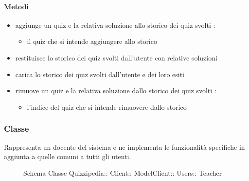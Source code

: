 \paragraph{Metodi}
\begin{itemize}
\item {}
\newline
aggiunge un quiz e la relativa soluzione allo storico dei quiz svolti
\newline
{} :
\begin{itemize}
\item {}
\newline
il quiz che si intende aggiungere allo storico
\end{itemize}
\item {}
\newline
restituisce lo storico dei quiz svolti dall'utente con relative soluzioni
\newline
\item {}
\newline
carica lo storico dei quiz svolti dall'utente e dei loro esiti
\newline
\item {}
\newline
rimuove un quiz e la relativa soluzione dallo storico dei quiz svolti
\newline
{} :
\begin{itemize}
\item {}
\newline
l'indice del quiz che si intende rimuovere dallo storico
\end{itemize}
\end{itemize}
\subsubsection{Classe }
Rappresenta un docente del sistema e ne implementa le funzionalità specifiche in aggiunta a quelle comuni a tutti gli utenti.
\begin{figure}[H]
\centering
\noindent{}
\caption[Schema Classe Teacher]{Schema Classe Quizzipedia:: Client:: ModelClient:: Users:: Teacher}
\end{figure}
